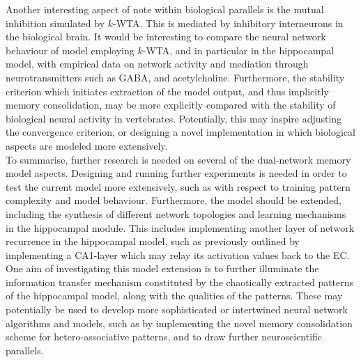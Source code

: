Another interesting aspect of note within biological parallels is the mutual inhibition simulated by $k$-WTA. This is mediated by inhibitory interneurons in the biological brain. It would be interesting to compare the neural network behaviour of model employing $k$-WTA, and in particular in the hippocampal model, with empirical data on network activity and mediation through neurotransmitters such as GABA, and acetylcholine.
Furthermore, the stability criterion which initiates extraction of the model output, and thus implicitly memory consolidation, may be more explicitly compared with the stability of biological neural activity in vertebrates. Potentially, this may inspire adjusting the convergence criterion, or designing a novel implementation in which biological aspects are modeled more extensively.
\\

To summarise, further research is needed on several of the dual-network memory model aspects. Designing and running further experiments is needed in order to test the current model more extensively, such as with respect to training pattern complexity and model behaviour. Furthermore, the model should be extended, including the synthesis of different network topologies and learning mechanisms in the hippocampal module. This includes implementing another layer of network recurrence in the hippocampal model, such as previously outlined by implementing a CA1-layer which may relay its activation values back to the EC.
One aim of investigating this model extension is to further illuminate the information transfer mechanism constituted by the chaotically extracted patterns of the hippocampal model, along with the qualities of the patterns. These may potentially be used to develop more sophisticated or intertwined neural network algorithms and models, such as by implementing the novel memory consolidation scheme for hetero-associative patterns, and to draw further neuroscientific parallels.







\cleardoublepage